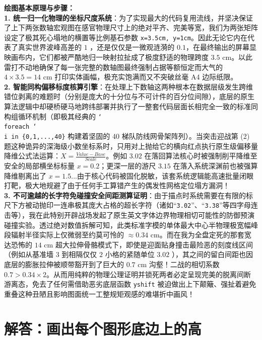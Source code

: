 {\small\color{blue!70!black}
\textbf{绘图基本原理与步骤：}\\
\textbf{1. 统一归一化物理的坐标尺度系统}：为了实现最大的代码复用流线，并坚决保证了上下两张数轴宏观图在感官物理尺寸上的绝对平齐、完美等宽，我们为两张矩阵设定了极其死心塌地的横置等比例基石参数 \texttt{x=3.5cm, y=1cm}。因此无论它内在代表了真实世界波峰高差的 $1$ ，还是仅仅是一微观涟漪的 $0.1$，在最终输出的屏幕显映画布内，它们都被严酷地归一映射拉扯成了极度舒适的物理跨度 $3.5\text{ cm}$。以此雷打不动地确保了每一张完整的数轴图最终强制占据等额恒定而大气的 $4 \times 3.5 = 14\text{ cm}$ 打印实体画幅，极充实饱满而又不突破丝毫 A4 边际纸限。\\
\textbf{2. 智能同构偏移标度核算引擎}：在处理上下数轴这两种根本在数据层级发生跨维错位剥离的难题时（分别是庞大的十分位与不可计件的百分位间隙），底层的原生算法逻辑中却硬桥硬马地跨纬部署并执行了一整套代码层面长相完全一致的标准同构组循环机制（即极其经典的 \texttt{\char`\\foreach \char`\\i in \{0,1,...,40\}} 构建着坚固的 40 梯队防线网骨架阵列）。当突击迎战第 (2) 题这种诡异的深海级小数坐标系时，只用对上抛给它的横向红点执行原生级偏移量降维公式法运算：$X = \frac{Value - Base}{Scale}$。例如 $3.02$ 在落回算法核心时被强制削平降维至安全的局部横坐标标量 $x = 0.2$；更深一层的游尺 $3.15$ 在落入系统深渊前也被强算降维剔离出了 $x = 1.5$...由于核心代码被固化脱敏，该套系统逻辑能高速批量闭眼打靶，极大地规避了由于任何手工算错产生的偶发性网格定位塌方漏洞！\\
\textbf{3. 不可逾越的长字符免碰撞安全间距测算证明}：由于描点时系统需要在有限的标尺下方被动抛印一连串极其庞大占格的超长字符（诸如“\texttt{3.02}”、“\texttt{3.38}”等四字母连击等），我在此特别开辟战场发起了原生英文字体边界物理相切可能性的防御预演碰撞实验。透过绝对数值拆解可知，此类标准字模的单体最大中心半物理极宽幅峰段辐射半径实际上仅微弱至约莫可怜的 $\approx0.34\text{ cm}$。而在我为全盘定死的那套宽达恐怖的 $14\text{ cm}$ 超大拉伸骨骼模式下，即使是迎面贴身撞击最险恶的刻度线区间（例如从基准墙 $3$ 到相隔仅仅 $2$ 小格的紧随单位 $3.02$ ），其之间的留白间距也因底层的膨胀拉伸被顺带豁开到了巨大的 $0.7\text{ cm}$ 沟壑！二战的相切系数 $0.7 > 0.34\times2$。从而用纯粹的物理公理证明并锁死两者必定呈现完美的脱离间断游离态，免去了任何需借助恶劣底层函数 \texttt{yshift} 被迫做出上下颠簸、强扯着避免重叠这种丑陋且影响图面统一工整规矩观感的难堪折中画风！
}


\newpage



\section{解答：画出每个图形底边上的高}

